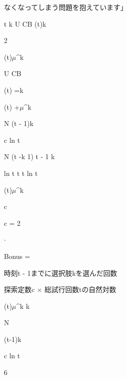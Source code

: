 なくなってしまう問題を抱えています」\par
t k U CB  (t)k\par
2\par
(t)$\mu$\textasciicircum{}k\par
U CB\par
(t) =k\par
(t) +$\mu$\textasciicircum{}k\par
N  (t - 1)k\par
c ln t\par
N  (t -k 1) t - 1 k\par
ln t t t ln t\par
(t)$\mu$\textasciicircum{}k\par
c\par
c = 2\par
$\cdot$\par
Bonus =\par
時刻t - 1までに選択肢kを選んだ回数\par
探索定数c $\times$ 総試⾏回数tの⾃然対数\par
(t)$\mu$\textasciicircum{}k k\par
N\par
(t-1)k\par
c ln t\par
6\par

